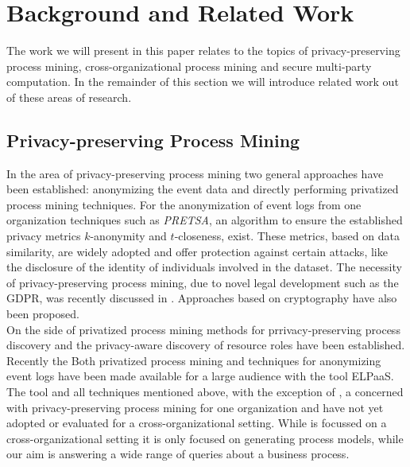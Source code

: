 \section{Background and Related Work}
\label{sec:background}
The work we will present in this paper relates to the topics of privacy-preserving process mining, cross-organizational process mining  and secure multi-party computation. In the remainder of this section we will introduce related work out of these areas of research.
\subsection{Privacy-preserving Process Mining}
\label{sec:privacy_process_mining}
In the area of privacy-preserving process mining\cite{pika2019towards} two general approaches have been established\cite{caise/Fahrenkrog-Petersen19}: anonymizing the event data and directly performing privatized process mining techniques. For the anonymization of event logs from one organization techniques such as \emph{PRETSA}\cite{icpm/Fahrenkrog-Petersen19}, an algorithm to ensure the established privacy metrics $k$-anonymity\cite{sweeney2002k} and $t$-closeness\cite{li2007t}, exist. These metrics\cite{DBLP:journals/csur/WagnerE18}, based on data similarity, are widely adopted and offer protection against certain attacks, like the disclosure of the identity of individuals involved in the dataset.  The necessity of privacy-preserving process mining, due to novel legal development such as the GDPR, was recently discussed in \cite{mannhardt2018privacy}.
 Approaches based on cryptography\cite{burattin2015toward,simpda/RafieiWA18} have also been proposed. \\
 On the side of privatized process mining methods for prrivacy-preserving process discovery\cite{MannhardtKBWM19,tillem2016privacy,tillem2017mining} and the privacy-aware discovery of resource roles\cite{rafiei2019role} have been established. Recently the 
 Both privatized process mining and techniques for anonymizing event logs have been made available for a large audience with the tool ELPaaS\cite{elpaas2019}. The tool and all techniques mentioned above, with the exception of \cite{tillem2017mining}, a concerned with privacy-preserving process mining for one organization and have not yet adopted or evaluated for a cross-organizational setting. While is focussed on a cross-organizational setting \cite{tillem2017mining} it is only focused on  generating process models, while our aim is answering a wide range of queries about a business process.
 

